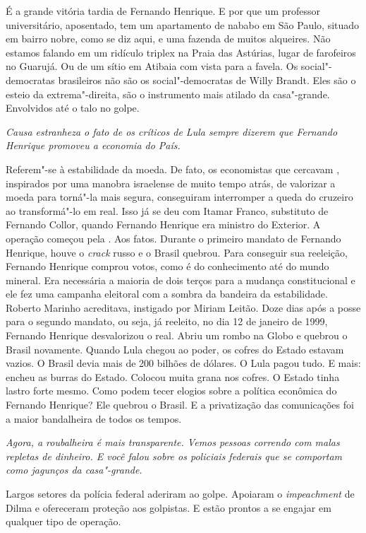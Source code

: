 \normalfont
É a grande vitória tardia de Fernando Henrique. E por que
um professor universitário, aposentado, tem um apartamento de nababo em
São Paulo, situado em bairro nobre, como se diz aqui, e uma fazenda de
muitos alqueires. Não estamos falando em um ridículo triplex na Praia
das Astúrias, lugar de farofeiros no Guarujá. Ou de um sítio em Atibaia
com vista para a favela. Os social"-democratas brasileiros não são os
social"-democratas de Willy Brandt. Eles são o esteio da extrema"-direita,
são o instrumento mais atilado da casa"-grande. Envolvidos até o talo no
golpe.

\itshape
 Causa estranheza o fato de os críticos de Lula sempre
dizerem que Fernando Henrique promoveu a economia do País.

\normalfont
Referem"-se à estabilidade da moeda. De fato, os
economistas que cercavam , inspirados por uma manobra israelense de
muito tempo atrás, de valorizar a moeda para torná"-la mais segura,
conseguiram interromper a queda do cruzeiro ao transformá"-lo em real.
Isso já se deu com Itamar Franco, substituto de Fernando Collor, quando
Fernando Henrique era ministro do Exterior. A operação começou pela .
Aos fatos. Durante o primeiro mandato de Fernando Henrique, houve o
\emph{crack} russo e o Brasil quebrou. Para conseguir sua reeleição,
Fernando Henrique comprou votos, como é do conhecimento até do mundo
mineral. Era necessária a maioria de dois terços para a mudança
constitucional e ele fez uma campanha eleitoral com a sombra da bandeira
da estabilidade. Roberto Marinho acreditava, instigado por Miriam
Leitão. Doze dias após a posse para o segundo mandato, ou seja, já
reeleito, no dia 12 de janeiro de 1999, Fernando Henrique desvalorizou o
real. Abriu um rombo na Globo e quebrou o Brasil novamente. Quando Lula
chegou ao poder, os cofres do Estado estavam vazios. O Brasil devia mais
de 200 bilhões de dólares. O Lula pagou tudo. E mais: encheu as burras
do Estado. Colocou muita grana nos cofres. O Estado tinha lastro forte
mesmo. Como podem tecer elogios sobre a política econômica do Fernando
Henrique? Ele quebrou o Brasil. E a privatização das comunicações foi a
maior bandalheira de todos os tempos.

\itshape
 Agora, a roubalheira é mais transparente. Vemos pessoas
correndo com malas repletas de dinheiro. E você falou sobre os policiais
federais que se comportam como jagunços da casa"-grande.

\normalfont
Largos setores da polícia federal aderiram ao golpe.
Apoiaram o \emph{impeachment} de Dilma e ofereceram proteção aos
golpistas. E estão prontos a se engajar em qualquer tipo de operação.

